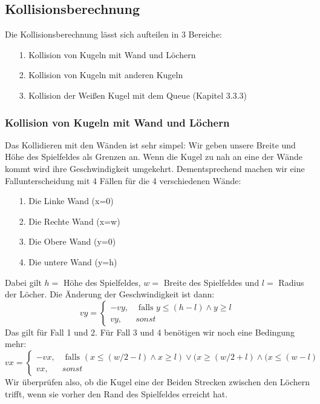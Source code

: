 \subsection{Kollisionsberechnung}
	Die Kollisionsberechnung lässt sich aufteilen in 3 Bereiche: \begin{itemize}
		\item [1.] Kollision von Kugeln mit Wand und Löchern
		\item [2.] Kollision von Kugeln mit anderen Kugeln
		\item [3.] Kollision der Weißen Kugel mit dem Queue (Kapitel 3.3.3)
	\end{itemize}
	\subsubsection{Kollision von Kugeln mit Wand und Löchern}
		Das Kollidieren mit den Wänden ist sehr simpel: Wir geben  unsere Breite und Höhe des Spielfeldes als Grenzen an. Wenn die Kugel zu nah an eine der Wände kommt wird ihre Geschwindigkeit umgekehrt. Dementsprechend machen wir eine Fallunterscheidung mit 4 Fällen für die 4 verschiedenen Wände: \begin{itemize}
			\item [1.] Die Linke Wand (x=0)
			\item [2.] Die Rechte Wand (x=w)
			\item [3.] Die Obere Wand (y=0)
			\item [4.] Die untere Wand (y=h)
		\end{itemize}
		Dabei gilt $ h = $ Höhe des Spielfeldes, $ w = $ Breite des Spielfeldes und $l = $ Radius der Löcher.
		Die Änderung der Geschwindigkeit ist dann:
		\begin{equation}
		vy = \begin{cases}
			-vy, & \text{ falls } y \leq (h- l) \land y \geq l\\
			vy, & sonst 
		\end{cases}
		\end{equation}
		Das gilt für Fall 1 und 2. Für Fall 3 und 4 benötigen wir noch eine Bedingung mehr:
		 \begin{equation}
		vx = \begin{cases}
		-vx, & \text{ falls } (x \leq (w/2 - l) \land x \geq l) \lor (x \geq (w/2 + l) \land (x \leq (w- l) \\
		vx, & sonst 
		\end{cases}
		\end{equation}
		Wir überprüfen also, ob die Kugel eine der Beiden Strecken zwischen den Löchern trifft, wenn sie vorher den Rand des Spielfeldes erreicht hat. 
